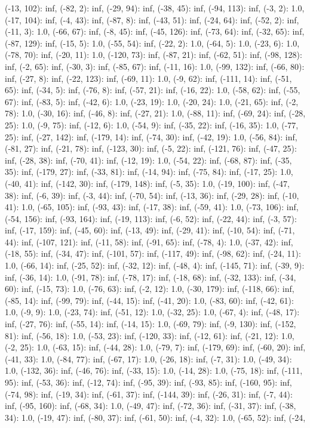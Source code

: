 \documentclass[parskip=half]{scrartcl}
\begin{document}
(-13, 102): inf, (-82, 2): inf, (-29, 94): inf, (-38, 45): inf, (-94, 113): inf, (-3, 2): 1.0, (-17, 104): inf, (-4, 43): inf, (-87, 8): inf, (-43, 51): inf, (-24, 64): inf, (-52, 2): inf, (-11, 3): 1.0, (-66, 67): inf, (-8, 45): inf, (-45, 126): inf, (-73, 64): inf, (-32, 65): inf, (-87, 129): inf, (-15, 5): 1.0, (-55, 54): inf, (-22, 2): 1.0, (-64, 5): 1.0, (-23, 6): 1.0, (-78, 70): inf, (-20, 11): 1.0, (-120, 73): inf, (-87, 21): inf, (-62, 51): inf, (-98, 128): inf, (-2, 65): inf, (-30, 3): inf, (-85, 67): inf, (-11, 16): 1.0, (-99, 132): inf, (-66, 80): inf, (-27, 8): inf, (-22, 123): inf, (-69, 11): 1.0, (-9, 62): inf, (-111, 14): inf, (-51, 65): inf, (-34, 5): inf, (-76, 8): inf, (-57, 21): inf, (-16, 22): 1.0, (-58, 62): inf, (-55, 67): inf, (-83, 5): inf, (-42, 6): 1.0, (-23, 19): 1.0, (-20, 24): 1.0, (-21, 65): inf, (-2, 78): 1.0, (-30, 16): inf, (-46, 8): inf, (-27, 21): 1.0, (-88, 11): inf, (-69, 24): inf, (-28, 25): 1.0, (-9, 75): inf, (-12, 6): 1.0, (-54, 9): inf, (-35, 22): inf, (-16, 35): 1.0, (-77, 25): inf, (-27, 142): inf, (-179, 14): inf, (-74, 30): inf, (-42, 19): 1.0, (-56, 84): inf, (-81, 27): inf, (-21, 78): inf, (-123, 30): inf, (-5, 22): inf, (-121, 76): inf, (-47, 25): inf, (-28, 38): inf, (-70, 41): inf, (-12, 19): 1.0, (-54, 22): inf, (-68, 87): inf, (-35, 35): inf, (-179, 27): inf, (-33, 81): inf, (-14, 94): inf, (-75, 84): inf, (-17, 25): 1.0, (-40, 41): inf, (-142, 30): inf, (-179, 148): inf, (-5, 35): 1.0, (-19, 100): inf, (-47, 38): inf, (-6, 39): inf, (-3, 44): inf, (-70, 54): inf, (-13, 36): inf, (-29, 28): inf, (-10, 41): 1.0, (-65, 105): inf, (-93, 43): inf, (-17, 38): inf, (-59, 41): 1.0, (-73, 106): inf, (-54, 156): inf, (-93, 164): inf, (-19, 113): inf, (-6, 52): inf, (-22, 44): inf, (-3, 57): inf, (-17, 159): inf, (-45, 60): inf, (-13, 49): inf, (-29, 41): inf, (-10, 54): inf, (-71, 44): inf, (-107, 121): inf, (-11, 58): inf, (-91, 65): inf, (-78, 4): 1.0, (-37, 42): inf, (-18, 55): inf, (-34, 47): inf, (-101, 57): inf, (-117, 49): inf, (-98, 62): inf, (-24, 11): 1.0, (-66, 14): inf, (-25, 52): inf, (-32, 12): inf, (-48, 4): inf, (-145, 71): inf, (-39, 9): inf, (-36, 14): 1.0, (-91, 78): inf, (-78, 17): inf, (-18, 68): inf, (-32, 133): inf, (-34, 60): inf, (-15, 73): 1.0, (-76, 63): inf, (-2, 12): 1.0, (-30, 179): inf, (-118, 66): inf, (-85, 14): inf, (-99, 79): inf, (-44, 15): inf, (-41, 20): 1.0, (-83, 60): inf, (-42, 61): 1.0, (-9, 9): 1.0, (-23, 74): inf, (-51, 12): 1.0, (-32, 25): 1.0, (-67, 4): inf, (-48, 17): inf, (-27, 76): inf, (-55, 14): inf, (-14, 15): 1.0, (-69, 79): inf, (-9, 130): inf, (-152, 81): inf, (-56, 18): 1.0, (-53, 23): inf, (-120, 33): inf, (-12, 61): inf, (-21, 12): 1.0, (-2, 25): 1.0, (-63, 15): inf, (-44, 28): 1.0, (-79, 7): inf, (-179, 69): inf, (-60, 20): inf, (-41, 33): 1.0, (-84, 77): inf, (-67, 17): 1.0, (-26, 18): inf, (-7, 31): 1.0, (-49, 34): 1.0, (-132, 36): inf, (-46, 76): inf, (-33, 15): 1.0, (-14, 28): 1.0, (-75, 18): inf, (-111, 95): inf, (-53, 36): inf, (-12, 74): inf, (-95, 39): inf, (-93, 85): inf, (-160, 95): inf, (-74, 98): inf, (-19, 34): inf, (-61, 37): inf, (-144, 39): inf, (-26, 31): inf, (-7, 44): inf, (-95, 160): inf, (-68, 34): 1.0, (-49, 47): inf, (-72, 36): inf, (-31, 37): inf, (-38, 34): 1.0, (-19, 47): inf, (-80, 37): inf, (-61, 50): inf, (-4, 32): 1.0, (-65, 52): inf, (-24, 
\end{document}
